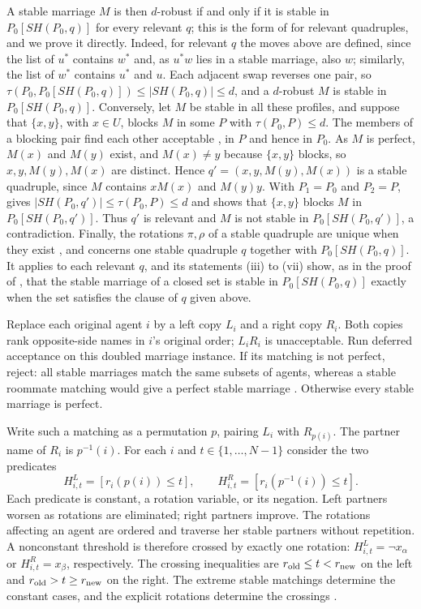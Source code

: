 \documentclass[11pt]{article}
\begin{document}
A stable marriage $M$ is then $d$-robust if and only if it is stable in
$P_0[SH(P_0,q)]$ for every relevant $q$; this is the form of
\cite[Lemma 3.15]{css} for relevant quadruples, and we prove it directly. Indeed, for relevant $q$ the moves
above are defined, since the list of $u^*$ contains $w^*$ and, as $u^*w$
lies in a stable marriage, also $w$; similarly, the list of $w^*$ contains
$u^*$ and $u$. Each adjacent swap reverses one pair, so
$\tau(P_0,P_0[SH(P_0,q)])\leq|SH(P_0,q)|\leq d$, and a $d$-robust $M$ is
stable in $P_0[SH(P_0,q)]$. Conversely, let $M$ be stable in all these
profiles, and suppose that $\{x,y\}$, with $x\in U$, blocks $M$ in some
$P$ with $\tau(P_0,P)\leq d$. The members of a blocking pair find each
other acceptable \cite[\S2, p.~7]{css}, in $P$ and hence in $P_0$. As $M$
is perfect, $M(x)$ and $M(y)$ exist, and $M(x)\neq y$ because $\{x,y\}$
blocks, so $x,y,M(y),M(x)$ are distinct. Hence $q'=(x,y,M(y),M(x))$ is a
stable quadruple, since $M$ contains $xM(x)$ and $M(y)y$. With $P_1=P_0$
and $P_2=P$, \cite[Lemma 3.14]{css} gives
$|SH(P_0,q')|\leq\tau(P_0,P)\leq d$ and shows that $\{x,y\}$ blocks $M$ in
$P_0[SH(P_0,q')]$. Thus $q'$ is relevant and $M$ is not stable in
$P_0[SH(P_0,q')]$, a contradiction. Finally, the rotations $\pi,\rho$ of a
stable quadruple are unique when they exist \cite[Lemma 3.18]{css}, and
\cite[Lemma 3.19]{css} concerns one stable quadruple $q$ together with
$P_0[SH(P_0,q)]$. It applies to each relevant $q$, and its statements
(iii) to (vii) show, as in the proof of \cite[Theorem 3.24]{css}, that the
stable marriage of a closed set is stable in $P_0[SH(P_0,q)]$ exactly when
the set satisfies the clause of $q$ given above.

Replace each original agent $i$ by a left copy $L_i$ and a right copy
$R_i$. Both copies rank opposite-side names in $i$'s original order;
$L_iR_i$ is unacceptable. Run deferred acceptance on this doubled
marriage instance. If its matching is not perfect, reject: all stable
marriages match the same subsets of agents, whereas a stable roommate
matching would give a perfect stable marriage
\cite[Proposition 2.3]{css}. Otherwise every stable marriage is perfect.

Write such a matching as a permutation $p$, pairing $L_i$ with $R_{p(i)}$.
The partner name of $R_i$ is $p^{-1}(i)$. For each $i$ and
$t\in\{1,\ldots,N-1\}$ consider the two predicates
\[
 H^L_{i,t}=[r_i(p(i))\leq t],\qquad
 H^R_{i,t}=[r_i(p^{-1}(i))\leq t].
\]
Each predicate is constant, a rotation variable, or its negation. Left partners worsen as
rotations are eliminated; right partners improve. The rotations affecting
an agent are ordered and traverse her stable partners without repetition.
A nonconstant threshold is therefore crossed by exactly one rotation:
$H^L_{i,t}=\neg x_\alpha$ or $H^R_{i,t}=x_\beta$, respectively.
The crossing inequalities are $r_{\rm old}\leq t<r_{\rm new}$ on the
left and $r_{\rm old}>t\geq r_{\rm new}$ on the right.
The extreme stable matchings determine the constant cases, and the
explicit rotations determine the crossings
\cite[Proposition 3.6(ii),(iv)]{css}.
\end{document}
